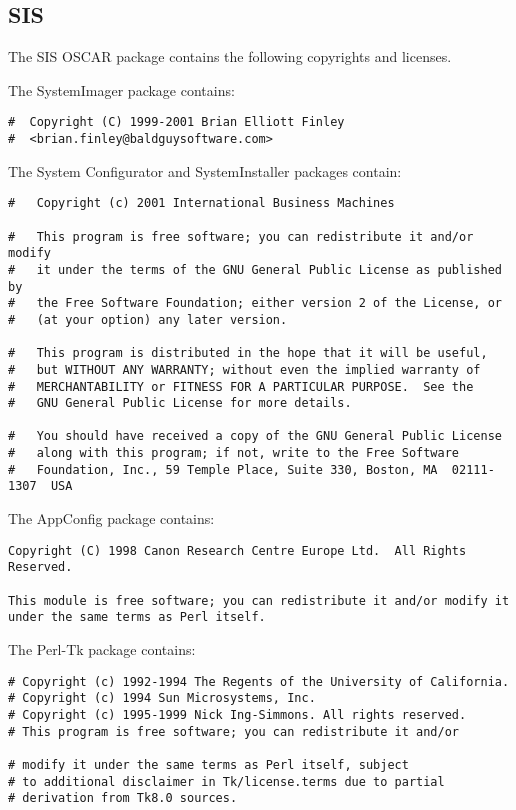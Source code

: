 %
%
%

\subsection{SIS}
The SIS OSCAR package contains the following copyrights and licenses.

The SystemImager package contains:

\begin{verbatim}
#  Copyright (C) 1999-2001 Brian Elliott Finley 
#  <brian.finley@baldguysoftware.com>
\end{verbatim}

The System Configurator and SystemInstaller packages contain:

\begin{verbatim}
#   Copyright (c) 2001 International Business Machines

#   This program is free software; you can redistribute it and/or modify
#   it under the terms of the GNU General Public License as published by
#   the Free Software Foundation; either version 2 of the License, or
#   (at your option) any later version.

#   This program is distributed in the hope that it will be useful,
#   but WITHOUT ANY WARRANTY; without even the implied warranty of
#   MERCHANTABILITY or FITNESS FOR A PARTICULAR PURPOSE.  See the
#   GNU General Public License for more details.

#   You should have received a copy of the GNU General Public License
#   along with this program; if not, write to the Free Software
#   Foundation, Inc., 59 Temple Place, Suite 330, Boston, MA  02111-1307  USA
\end{verbatim}

The AppConfig package contains:

\begin{verbatim}
Copyright (C) 1998 Canon Research Centre Europe Ltd.  All Rights Reserved.

This module is free software; you can redistribute it and/or modify it 
under the same terms as Perl itself.
\end{verbatim}

The Perl-Tk package contains:

\begin{verbatim}
# Copyright (c) 1992-1994 The Regents of the University of California.
# Copyright (c) 1994 Sun Microsystems, Inc.
# Copyright (c) 1995-1999 Nick Ing-Simmons. All rights reserved.
# This program is free software; you can redistribute it and/or

# modify it under the same terms as Perl itself, subject
# to additional disclaimer in Tk/license.terms due to partial
# derivation from Tk8.0 sources.
\end{verbatim}

